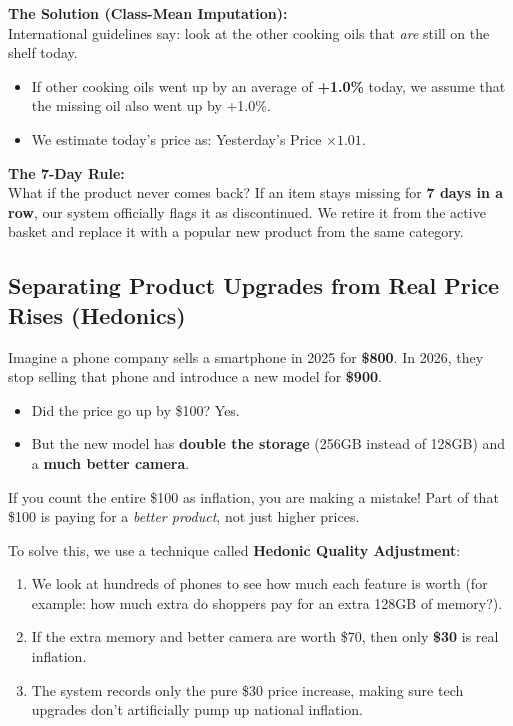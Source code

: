 \documentclass[11pt,a4paper,oneside]{article}
\begin{document}
\textbf{The Solution (Class-Mean Imputation):}\\
International guidelines say: look at the other cooking oils that \textit{are} still on the shelf today.
\begin{itemize}
    \item If other cooking oils went up by an average of \textbf{+1.0\%} today, we assume that the missing oil also went up by +1.0\%.
    \item We estimate today's price as: Yesterday's Price $\times 1.01$.
\end{itemize}

\textbf{The 7-Day Rule:}\\
What if the product never comes back? If an item stays missing for \textbf{7 days in a row}, our system officially flags it as discontinued. We retire it from the active basket and replace it with a popular new product from the same category.

\subsection{Separating Product Upgrades from Real Price Rises (Hedonics)}
Imagine a phone company sells a smartphone in 2025 for \textbf{\$800}. In 2026, they stop selling that phone and introduce a new model for \textbf{\$900}.
\begin{itemize}
    \item Did the price go up by \$100? Yes.
    \item But the new model has \textbf{double the storage} (256GB instead of 128GB) and a \textbf{much better camera}.
\end{itemize}
If you count the entire \$100 as inflation, you are making a mistake! Part of that \$100 is paying for a \textit{better product}, not just higher prices.

To solve this, we use a technique called \textbf{Hedonic Quality Adjustment}:
\begin{enumerate}
    \item We look at hundreds of phones to see how much each feature is worth (for example: how much extra do shoppers pay for an extra 128GB of memory?).
    \item If the extra memory and better camera are worth \$70, then only \textbf{\$30} is real inflation.
    \item The system records only the pure \$30 price increase, making sure tech upgrades don't artificially pump up national inflation.
\end{enumerate}
\end{document}
